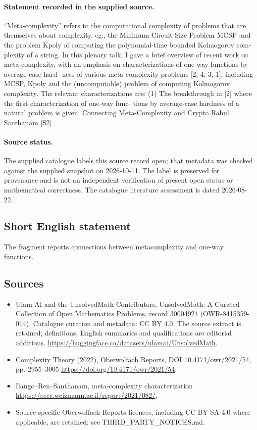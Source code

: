 \documentclass[11pt]{article}
\newcommand{\sref}[2]{\hyperlink{source:#1:#2}{[S#2]}}
\begin{document}
\paragraph{Statement recorded in the supplied source.}
“Meta-complexity” refers to the computational complexity of problems that are themselves about complexity, eg., the Minimum Circuit Size Problem MCSP and the problem Kpoly of computing the polynomial-time bounded Kolmogorov com- plexity of a string. In this plenary talk, I gave a brief overview of recent work on meta-complexity, with an emphasis on characterizations of one-way functions by average-case hard- ness of various meta-complexity problems [2, 4, 3, 1], including MCSP, Kpoly and the (uncomputable) problem of computing Kolmogorov complexity. The relevant characterizations are: (1) The breakthrough in [2] where the first characterization of one-way func- tions by average-case hardness of a natural problem is given. Connecting Meta-Complexity and Crypto Rahul Santhanam \sref{30004924}{2}
\paragraph{Source status.}
The supplied catalogue labels this source record open; that metadata was checked against the supplied snapshot on 2026-10-11. The label is preserved for provenance and is not an independent verification of present open status or mathematical correctness. The catalogue literature assessment is dated 2026-08-22.
\subsection{Short English statement}
The fragment reports connections between metacomplexity and one-way functions.
\subsection{Sources}
\begin{itemize}
\item[\hypertarget{source:30004924:1}{S1}] Ulam AI and the UnsolvedMath Contributors, UnsolvedMath: A Curated Collection of Open Mathematics Problems, record 30004924 (OWR-8415359-014). Catalogue curation and metadata: CC BY 4.0. The source extract is retained; definitions, English summaries and qualifications are editorial additions.
\url{https://huggingface.co/datasets/ulamai/UnsolvedMath}.
\item[\hypertarget{source:30004924:2}{S2}] Complexity Theory (2022), Oberwolfach Reports, DOI 10.4171/owr/2021/54, pp. 2955--3005
\url{https://doi.org/10.4171/owr/2021/54}.
\item[\hypertarget{source:30004924:3}{S3}] Ilango--Ren--Santhanam, meta-complexity characterization
\url{https://eccc.weizmann.ac.il/report/2021/082/}.
\item Source-specific Oberwolfach Reports licences, including CC BY-SA 4.0 where applicable, are retained; see THIRD\_PARTY\_NOTICES.md.
\end{itemize}
\end{document}
